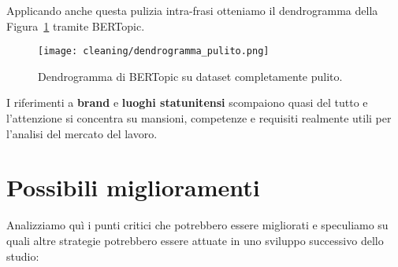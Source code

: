 \noindent Applicando anche questa pulizia intra-frasi otteniamo il dendrogramma della Figura~\ref{fig:cleaned-dendrogram} tramite BERTopic.

\begin{figure}[H]
    \centering
    \texttt{[image: cleaning/dendrogramma\_pulito.png]}
    \caption{Dendrogramma di BERTopic su dataset completamente pulito.}
    \label{fig:cleaned-dendrogram}
\end{figure}

\noindent I riferimenti a \textbf{brand} e \textbf{luoghi statunitensi} scompaiono quasi del tutto e l'attenzione si concentra su mansioni, competenze e requisiti realmente utili per l'analisi del mercato del lavoro.
\section{Possibili miglioramenti}
Analizziamo quì i punti critici che potrebbero essere migliorati e speculiamo su quali altre strategie potrebbero essere attuate in uno sviluppo successivo dello studio:

